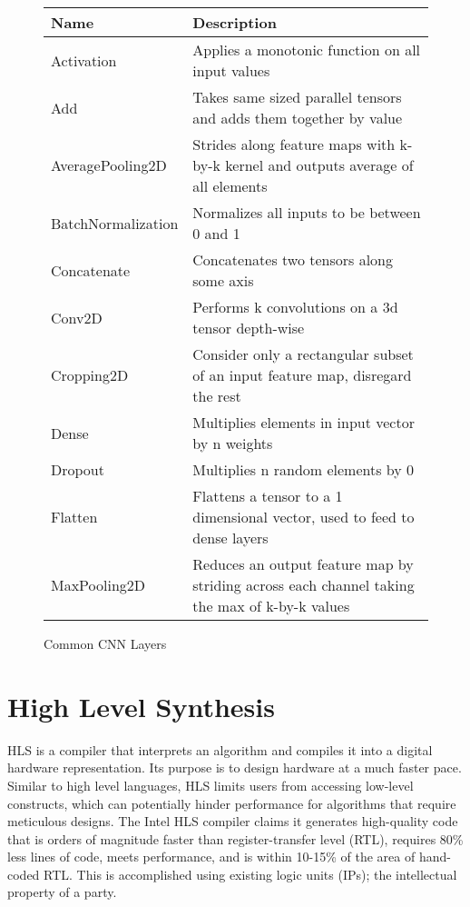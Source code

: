 \begin{figure}
	\centering
	\begin{tabular}{ |p{4cm}|p{11.6cm}|  }
		\hline
		Name & Description \\
		\hline
		Activation & Applies a monotonic function on all input values\\
		Add & Takes same sized parallel tensors and adds them together by value \\
		AveragePooling2D & Strides along feature maps with k-by-k kernel and outputs average of all elements \\
		BatchNormalization & Normalizes all inputs to be between 0 and 1 \\
		Concatenate & Concatenates two tensors along some axis \\
		Conv2D & Performs k convolutions on a 3d tensor depth-wise \\
		Cropping2D & Consider only a rectangular subset of an input feature map, disregard the rest \\
		Dense & Multiplies elements in input vector by n weights \\
		Dropout & Multiplies n random elements by 0 \\
		Flatten & Flattens a tensor to a 1 dimensional vector, used to feed to dense layers \\
		MaxPooling2D & Reduces an output feature map by striding across each channel taking the max of k-by-k values \\
		\hline
	\end{tabular}
	\label{layer_types}
	\caption{Common CNN Layers}
\end{figure}

\section{High Level Synthesis}
HLS is a compiler that interprets an algorithm and compiles it into a digital hardware representation. Its purpose is to design hardware at a much faster pace. Similar to high level languages, HLS limits users from accessing low-level constructs, which can potentially hinder performance for algorithms that require meticulous designs. The Intel HLS compiler claims it generates high-quality code that is orders of magnitude faster than register-transfer level (RTL), requires 80\% less lines of code, meets performance, and is within 10-15\% of the area of hand- coded RTL. This is accomplished using existing logic units (IPs); the intellectual property of a party.

